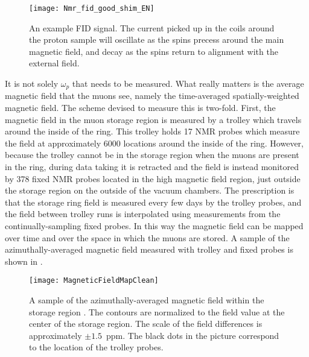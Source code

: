 \begin{figure}[]
    \centering
    \texttt{[image: Nmr\_fid\_good\_shim\_EN]}
    \caption[FID signal]{An example FID signal. The current picked up in the coils around the proton sample will oscillate as the spins precess around the main magnetic field, and decay as the spins return to alignment with the external field.}
    \label{fig:FID}
\end{figure}

It is not solely $\omega_{p}$ that needs to be measured. What really matters is the average magnetic field that the muons see, namely the time-averaged spatially-weighted magnetic field. The scheme devised to measure this is two-fold. First, the magnetic field in the muon storage region is measured by a trolley which travels around the inside of the ring. This trolley holds 17 NMR probes which measure the field at approximately 6000 locations around the inside of the ring. However, because the trolley cannot be in the storage region when the muons are present in the ring, during data taking it is retracted and the field is instead monitored by 378 fixed NMR probes located in the high magnetic field region, just outside the storage region on the outside of the vacuum chambers. The prescription is that the storage ring field is measured every few days by the trolley probes, and the field between trolley runs is interpolated using measurements from the continually-sampling fixed probes. In this way the magnetic field can be mapped over time and over the space in which the muons are stored. A sample of the azimuthally-averaged magnetic field measured with trolley and fixed probes is shown in .

\begin{figure}[]
    \centering
    \texttt{[image: MagneticFieldMapClean]}
    \caption[Azimuthally averaged magnetic field sample]{A sample of the azimuthally-averaged magnetic field within the storage region \cite{fieldmap}. The contours are normalized to the field value at the center of the storage region. The scale of the field differences is approximately $\pm 1.5$~ppm. The black dots in the picture correspond to the location of the trolley probes.}
    \label{fig:AverageMagneticField}
\end{figure}


